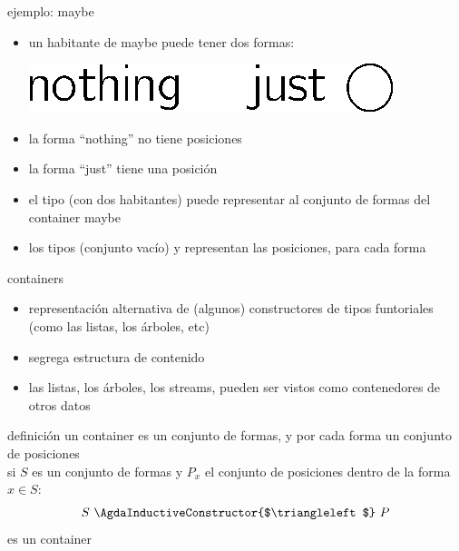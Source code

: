 \documentclass[9pt]{beamer}
\newcommand{\saltar}{\vspace{1ex}}
\begin{document}
\begin{frame}{ejemplo: maybe}
  \begin{itemize}
  \item un habitante de maybe puede tener dos formas: \saltar
    \begin{center}\hspace{-2cm}\includegraphics[scale=0.5]{img/emaybe.eps}\end{center}
    \pause
  \item la forma ``nothing'' no tiene posiciones
  \item la forma ``just'' tiene una posición
    \pause
  \end{itemize}
  \begin{itemize} [triangle]
  \item el tipo  (con dos habitantes) puede representar al conjunto de formas del container maybe
  \item los tipos \AgdaDatatype{$\emptyset$} (conjunto vacío) y  representan las posiciones, para cada forma
  \end{itemize}
\end{frame}


\begin{frame}{containers}
  \begin{itemize}
  \item representación alternativa de (algunos) constructores de tipos funtoriales (como las listas, los árboles, etc)
  \item segrega \alert{estructura} de \alert{contenido}
  \item las listas, los árboles, los streams, pueden ser vistos como \alert{contenedores} de otros datos
  \end{itemize}
  \pause
  \begin{block}{definición}
    un \alert{container} es un conjunto de formas, y por cada forma un conjunto de posiciones\\ \saltar
    si $S$ es un conjunto de formas y $P_x$ el conjunto de posiciones dentro de la forma $x \in S$:\\
    $$S \ \AgdaInductiveConstructor{$\triangleleft$}\ P$$
    es un container\saltar
  \end{block}
\end{frame}
\end{document}
